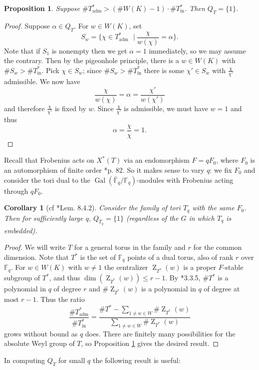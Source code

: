 \documentclass{mrlart7}
\theoremstyle{plain}
\newtheorem{proposition}[theorem]{Proposition}
\newtheorem{corollary}[theorem]{Corollary}
\theoremstyle{definition}
\numberwithin{equation}{section}
\DeclareMathOperator{\Gal}{Gal}
\DeclareMathOperator{\Z}{Z}
\newcommand{\Fq}{\mathbb{F}_q}
\newcommand{\Fqb}{\bar{\mathbb{F}}_q}
\newcommand{\st}{\ensuremath{\ \ \ \vert\ }}
\newcommand{\Thadm}{T^*_{\operatorname{adm}}}
\newcommand{\Thinadm}{T^*_{\operatorname{in}}}
\newcommand{\hatT}{T^*}
\begin{document}
\begin{proposition} \label{pigeonhole}
Suppose $\#\Thadm > (\# W(K) - 1) \cdot \# \Thinadm$.  Then $Q_T = \{ 1 \}$.
\end{proposition}
\begin{proof}
Suppose $\alpha \in Q_T$.  For $w \in W(K)$, set
$$S_w = \{\chi \in \Thadm \st  \frac{\chi}{w(\chi)} = \alpha\}.$$
Note that if $S_1$ is nonempty then we get $\alpha = 1$ immediately, so we may
assume the contrary.  Then by the pigeonhole principle, there is a $w \in W(K)$
with $\# S_w > \# \Thinadm$.  Pick $\chi \in S_w$; since $\# S_w > \#\Thinadm$
there is some $\chi' \in S_w$ with $\frac{\chi}{\chi'}$ admissible.  We now have
$$\frac{\chi}{w(\chi)} = \alpha = \frac{\chi'}{w(\chi')}$$
and therefore $\frac{\chi}{\chi'}$ is fixed by $w$.  Since $\frac{\chi}{\chi'}$ is admissible, we must have $w = 1$ and thus
$$\alpha = \frac{\chi}{\chi} = 1.$$
\end{proof}

Recall that Frobenius acts on $X^*(T)$ via an endomorphism $F = qF_0$, where
$F_0$ is an automorphism of finite order \cite{carter:93a}*{p. 82}.  So it makes sense
to vary $q$: we fix $F_0$ and consider the tori dual to the $\Gal(\Fqb/\Fq)$-modules
with Frobenius acting through $qF_0$.

\begin{corollary}[{cf \cite{carter:93a}*{Lem. 8.4.2}}]
Consider the family of tori $T_q$ with the same $F_0$.  Then for sufficiently large $q$,
$Q_{T_q} = \{ 1 \}$ (regardless of the $G$ in which $T_q$ is embedded).
\end{corollary}
\begin{proof}
We will write $T$ for a general torus in the family and $r$ for the common dimension.
Note that $\hatT$ is the set of $\Fq$ points of a dual torus, also of rank $r$ over $\Fq$.
For $w \in W(K)$ with $w \ne 1$ the centralizer $\Z_{\hatT}(w)$ is a proper $F$-stable
subgroup of $\hatT$, and thus $\dim(\Z_{\hatT}(w)) \le r - 1$.  By \cite{carter:93a}*{3.3.5},
$\# \hatT$ is a polynomial in $q$ of degree $r$ and $\# \Z_{\hatT}(w)$ is a polynomial
in $q$ of degree at most $r-1$.  Thus the ratio
$$\frac{\# \Thadm}{\# \Thinadm} = \frac{\# \hatT - \sum_{1 \ne w \in W} \# \Z_{\hatT}(w)}{\sum_{1 \ne w \in W} \# \Z_{\hatT}(w)}$$
grows without bound as $q$ does.  There are finitely many possibilities for the absolute
Weyl group of $T$, so Proposition \ref{pigeonhole} gives the desired result.
\end{proof}

In computing $Q_T$ for small $q$ the following result is useful:
\end{document}
